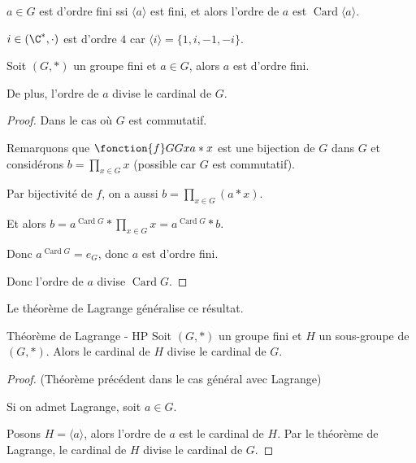 \begin{corollaire}{}{}
    $a \in G$ est d'ordre fini ssi $\langle a \rangle$ est fini, et alors l'ordre de 
    $a$ est $\operatorname{Card} \langle a \rangle$.
\end{corollaire}

\begin{exemple}
    $i \in (\C^*, \cdot)$ est d'ordre $4$ car
    $\langle i \rangle = \{1, i, -1, -i\}$.
\end{exemple}

\begin{theoreme}{}{}
    Soit $(G, \ast)$ un groupe fini et $a \in G$, 
    alors $a$ est d'ordre fini. 

    De plus, l'ordre de $a$ divise le cardinal de $G$.
\end{theoreme}


\begin{proof}
    Dans le cas où $G$ est commutatif. 

    Remarquons que $\fonction{f} G G x {a \ast x}$ est une bijection de $G$ dans $G$
    et considérons $\displaystyle b = \prod_{x \in G} x$ (possible car $G$ est commutatif).

    Par bijectivité de $f$, on a aussi $\displaystyle b = \prod_{x \in G} (a \ast x)$.

    Et alors $\displaystyle b = a^{\operatorname{Card} G} \ast \prod_{x \in G} x = a^{\operatorname{Card} G} \ast b$.

    Donc $a^{\operatorname{Card} G} = e_G$, donc $a$ est d'ordre fini.

    Donc l'ordre de $a$ divise $\operatorname{Card} G$.
\end{proof}

Le théorème de Lagrange généralise ce résultat.

\begin{theoreme}{Théorème de Lagrange - HP}{}
    Soit $(G, \ast)$ un groupe fini et $H$ un sous-groupe de $(G, \ast)$.
    Alors le cardinal de $H$ divise le cardinal de $G$.
\end{theoreme}

\begin{proof}(Théorème précédent dans le cas général avec Lagrange)

    Si on admet Lagrange, soit $a \in G$.

    Posons $H = \langle a \rangle$, alors l'ordre de $a$ est le cardinal de $H$.
    Par le théorème de Lagrange, le cardinal de $H$ divise le cardinal de $G$.
\end{proof}


